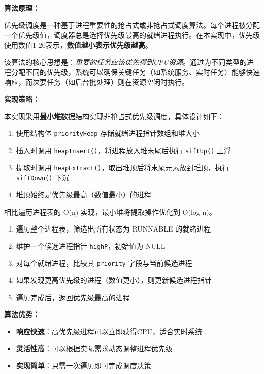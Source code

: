 \documentclass[a4paper, 12pt]{article}
\begin{document}
    \textbf{算法原理：}
    
    优先级调度是一种基于进程重要性的抢占式或非抢占式调度算法。每个进程被分配一个优先级值，调度器总是选择优先级最高的就绪进程执行。在本实现中，优先级使用数值1-20表示，\textbf{数值越小表示优先级越高}。
    
    该算法的核心思想是：\textit{重要的任务应该优先得到CPU资源}。通过为不同类型的进程分配不同的优先级，系统可以确保关键任务（如系统服务、实时任务）能够快速响应，而次要任务（如后台批处理）则在资源空闲时执行。
    
    \textbf{实现策略：}
    
    本实现采用\textbf{最小堆}数据结构实现非抢占式优先级调度，具体设计如下：
    \begin{enumerate}[itemsep=2pt]
        \item 使用结构体 \texttt{priorityHeap} 存储就绪进程指针数组和堆大小
        \item 插入时调用 \texttt{heapInsert()}，将进程放入堆末尾后执行 \texttt{siftUp()} 上浮
        \item 提取时调用 \texttt{heapExtract()}，取出堆顶后将末尾元素放到堆顶，执行 \texttt{siftDown()} 下沉
        \item 堆顶始终是优先级最高（数值最小）的进程
    \end{enumerate}
    
    相比遍历进程表的 O(n) 实现，最小堆将提取操作优化到 O(log n)。
    \begin{enumerate}[itemsep=2pt]
        \item 遍历整个进程表，筛选出所有状态为 RUNNABLE 的就绪进程
        \item 维护一个候选进程指针 \texttt{highP}，初始值为 NULL
        \item 对每个就绪进程，比较其 \texttt{priority} 字段与当前候选进程
        \item 如果发现更高优先级的进程（数值更小），则更新候选进程指针
        \item 遍历完成后，返回优先级最高的进程
    \end{enumerate}
    
    \textbf{算法优势：}
    \begin{itemize}[itemsep=0pt]
        \item \textbf{响应快速}：高优先级进程可以立即获得CPU，适合实时系统
        \item \textbf{灵活性高}：可以根据实际需求动态调整进程优先级
        \item \textbf{实现简单}：只需一次遍历即可完成调度决策
    \end{itemize}
    
\end{document}
